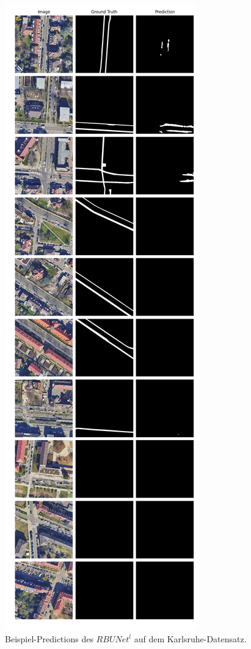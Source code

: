 \begin{figure}
	\centering
	\includegraphics[width=.41\textwidth]{Bilder/Samples-KA/rbunet-l.png} 
	\caption{Beispiel-Predictions des $RBUNet^l$ auf dem Karlsruhe-Datensatz.}
	\label{fig:ka-samples-rbunet-l}
\end{figure}

